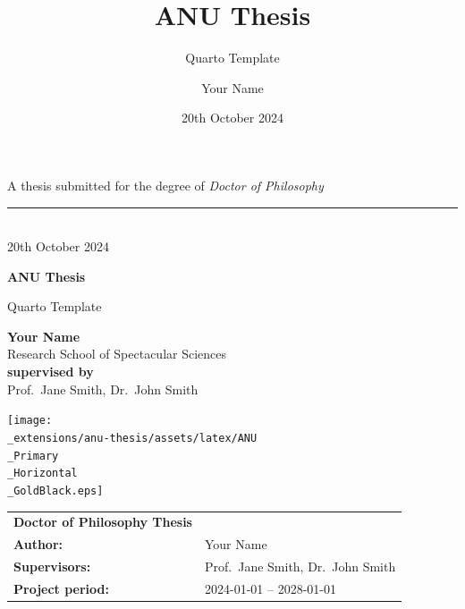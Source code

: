 \documentclass[
  a4paper,
  oneside,
  openany,
  12pt,
  onecolumn]{book}
\title{ANU Thesis}
\subtitle{Quarto Template}
\author{Your Name}
\date{20th October 2024}
\theoremstyle{definition}
\theoremstyle{plain}
\theoremstyle{remark}
\begin{document}
  \begin{frontmatter}
  \begin{titlepage}

  \begin{titlepage}
    \begin{flushright}%
      \vspace{50mm}
      {\small A thesis submitted for the degree of {\it Doctor of
  Philosophy}}
      \rule[1ex]{\textwidth}{1pt}\\
      {\fontsize{9}{0} 20th October 2024}\\
      \vspace{25mm}
      {\fontsize{40}{44}\bfseries ANU Thesis\par}
        \vspace{12mm}
    	\parbox{\textwidth}{
  	\begin{flushright}
  		\fontsize{28}{30} Quarto Template
  	\end{flushright}}
  	    \vfill
      {\fontsize{20}{0}\bfseries Your Name}\\
      \vspace{2mm}
      {\fontsize{8}{0} Research School of Spectacular Sciences}\\
      \vspace{35mm}
      {\fontsize{10}{0}\bfseries supervised by}\\
      Prof.~Jane Smith, Dr.~John Smith
      
      \vspace{2.0cm}
  		\texttt{[image: \\\_extensions/anu-thesis/assets/latex/ANU\\\_Primary\\\_Horizontal\\\_GoldBlack.eps]}\\
   \end{flushright}%

   \clearpage\thispagestyle{empty}
   \normalfont
   \vspace*{\fill}
   \noindent
   \begin{tabular}{lp{10cm}}
     {\bf Doctor of Philosophy Thesis} & \\[2mm]
     {\bf Author:} & Your Name\\[2mm]
     {\bf Supervisors:} & Prof.~Jane Smith, Dr.~John Smith\\[2mm]
     
     {\bf Project period:} & 2024-01-01 -- 2028-01-01 \\[2mm]
   \end{tabular}\\[2mm]


\end{titlepage}
\end{titlepage}
\end{frontmatter}
\end{document}
